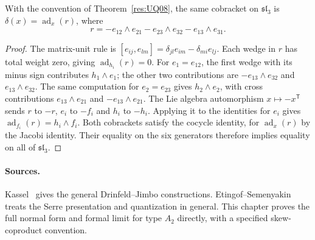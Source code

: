 \begin{corollary}
\label{res:UQ09}
With the convention of Theorem~\ref{res:UQ08},
the same cobracket on \(\mathfrak{sl}_3\) is
\(\delta(x)=\operatorname{ad}_x(r)\), where
\[
 r=-e_{12}\wedge e_{21}-e_{23}\wedge e_{32}-e_{13}\wedge e_{31}.
\]
\end{corollary}
\begin{proof}
The matrix-unit rule is
\([e_{ij},e_{lm}]=\delta_{jl}e_{im}-\delta_{mi}e_{lj}\).
Each wedge in \(r\) has total weight zero, giving
\(\operatorname{ad}_{h_i}(r)=0\).
For \(e_1=e_{12}\), the first wedge with its minus sign
contributes \(h_1\wedge e_1\); the other two contributions
are \(-e_{13}\wedge e_{32}\) and \(e_{13}\wedge e_{32}\).
The same computation for \(e_2=e_{23}\) gives
\(h_2\wedge e_2\), with cross contributions
\(e_{13}\wedge e_{21}\) and \(-e_{13}\wedge e_{21}\).
The Lie algebra automorphism \(x\mapsto-x^{\mathsf T}\)
sends \(r\) to \(-r\), \(e_i\) to \(-f_i\) and
\(h_i\) to \(-h_i\). Applying it to the identities for
\(e_i\) gives \(\operatorname{ad}_{f_i}(r)=h_i\wedge f_i\).
Both cobrackets satisfy the cocycle identity, for
\(\operatorname{ad}_x(r)\) by the Jacobi identity.
Their equality on the six generators therefore
implies equality on all of \(\mathfrak{sl}_3\).
\end{proof}

\paragraph{Sources.}
Kassel~\cite[Sections XVI.5 and XVII.2]{kassel} gives the
general Drinfeld--Jimbo constructions. Etingof--Semenyakin
~\cite[Sections 4.1--4.2]{etingof-semenyakin} treats the
Serre presentation and quantization in general.
This chapter proves the full normal form and formal limit
for type \(A_2\) directly, with a specified skew-coproduct
convention.
